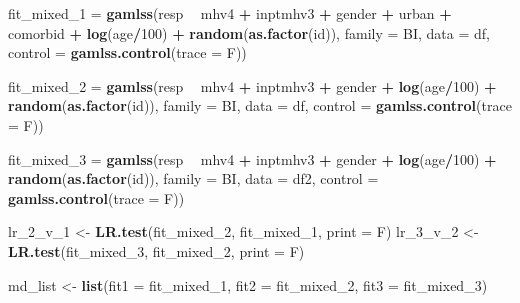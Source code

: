 \documentclass[
  11pt,
]{article}
\newenvironment{Shaded}{\begin{snugshade}}{\end{snugshade}}
\newcommand{\DataTypeTok}[1]{\textcolor[rgb]{0.13,0.29,0.53}{#1}}
\newcommand{\DecValTok}[1]{\textcolor[rgb]{0.00,0.00,0.81}{#1}}
\newcommand{\KeywordTok}[1]{\textcolor[rgb]{0.13,0.29,0.53}{\textbf{#1}}}
\newcommand{\NormalTok}[1]{#1}
\newcommand{\OperatorTok}[1]{\textcolor[rgb]{0.81,0.36,0.00}{\textbf{#1}}}
\newcommand{\StringTok}[1]{\textcolor[rgb]{0.31,0.60,0.02}{#1}}
\begin{document}
\begin{Shaded}
\begin{Highlighting}[]
\NormalTok{fit_mixed_}\DecValTok{1}\NormalTok{ =}\StringTok{ }\KeywordTok{gamlss}\NormalTok{(resp }\OperatorTok{~}\StringTok{ }\NormalTok{mhv4 }\OperatorTok{+}\StringTok{ }\NormalTok{inptmhv3 }\OperatorTok{+}\StringTok{ }\NormalTok{gender }\OperatorTok{+}\StringTok{ }\NormalTok{urban }\OperatorTok{+}\StringTok{ }\NormalTok{comorbid }\OperatorTok{+}\StringTok{ }
\StringTok{                       }\KeywordTok{log}\NormalTok{(age}\OperatorTok{/}\DecValTok{100}\NormalTok{) }\OperatorTok{+}\StringTok{ }\KeywordTok{random}\NormalTok{(}\KeywordTok{as.factor}\NormalTok{(id)),}
                     \DataTypeTok{family =}\NormalTok{ BI, }\DataTypeTok{data =}\NormalTok{ df, }
                     \DataTypeTok{control =} \KeywordTok{gamlss.control}\NormalTok{(}\DataTypeTok{trace =}\NormalTok{ F))}

\NormalTok{fit_mixed_}\DecValTok{2}\NormalTok{ =}\StringTok{ }\KeywordTok{gamlss}\NormalTok{(resp }\OperatorTok{~}\StringTok{ }\NormalTok{mhv4 }\OperatorTok{+}\StringTok{ }\NormalTok{inptmhv3 }\OperatorTok{+}\StringTok{ }\NormalTok{gender }\OperatorTok{+}\StringTok{ }
\StringTok{                       }\KeywordTok{log}\NormalTok{(age}\OperatorTok{/}\DecValTok{100}\NormalTok{) }\OperatorTok{+}\StringTok{ }\KeywordTok{random}\NormalTok{(}\KeywordTok{as.factor}\NormalTok{(id)),}
                     \DataTypeTok{family =}\NormalTok{ BI, }\DataTypeTok{data =}\NormalTok{ df, }
                     \DataTypeTok{control =} \KeywordTok{gamlss.control}\NormalTok{(}\DataTypeTok{trace =}\NormalTok{ F))}

\NormalTok{fit_mixed_}\DecValTok{3}\NormalTok{ =}\StringTok{ }\KeywordTok{gamlss}\NormalTok{(resp }\OperatorTok{~}\StringTok{ }\NormalTok{mhv4 }\OperatorTok{+}\StringTok{ }\NormalTok{inptmhv3 }\OperatorTok{+}\StringTok{ }\NormalTok{gender }\OperatorTok{+}\StringTok{ }
\StringTok{                       }\KeywordTok{log}\NormalTok{(age}\OperatorTok{/}\DecValTok{100}\NormalTok{) }\OperatorTok{+}\StringTok{ }\KeywordTok{random}\NormalTok{(}\KeywordTok{as.factor}\NormalTok{(id)),}
                     \DataTypeTok{family =}\NormalTok{ BI, }\DataTypeTok{data =}\NormalTok{ df2,}
                     \DataTypeTok{control =} \KeywordTok{gamlss.control}\NormalTok{(}\DataTypeTok{trace =}\NormalTok{ F))}


\NormalTok{lr_}\DecValTok{2}\NormalTok{_v_}\DecValTok{1}\NormalTok{ <-}\StringTok{ }\KeywordTok{LR.test}\NormalTok{(fit_mixed_}\DecValTok{2}\NormalTok{, fit_mixed_}\DecValTok{1}\NormalTok{, }\DataTypeTok{print =}\NormalTok{ F)}
\NormalTok{lr_}\DecValTok{3}\NormalTok{_v_}\DecValTok{2}\NormalTok{ <-}\StringTok{ }\KeywordTok{LR.test}\NormalTok{(fit_mixed_}\DecValTok{3}\NormalTok{, fit_mixed_}\DecValTok{2}\NormalTok{, }\DataTypeTok{print =}\NormalTok{ F)}

\NormalTok{md_list <-}\StringTok{ }\KeywordTok{list}\NormalTok{(}\DataTypeTok{fit1 =}\NormalTok{ fit_mixed_}\DecValTok{1}\NormalTok{, }\DataTypeTok{fit2 =}\NormalTok{ fit_mixed_}\DecValTok{2}\NormalTok{, }\DataTypeTok{fit3 =}\NormalTok{ fit_mixed_}\DecValTok{3}\NormalTok{)}
\end{Highlighting}
\end{Shaded}
\end{document}
